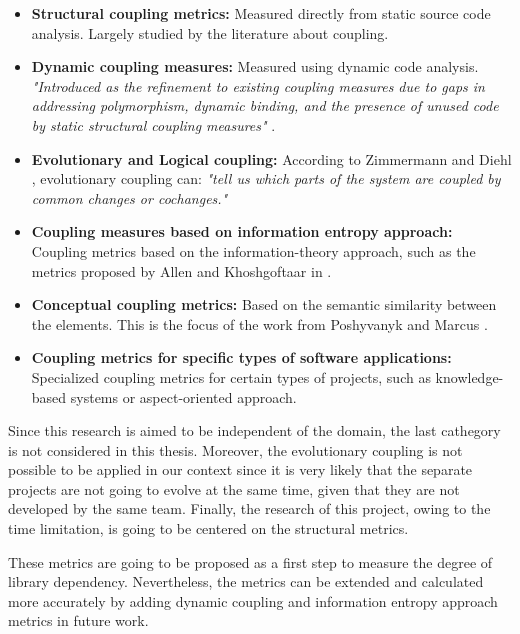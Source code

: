 \begin{itemize}
  \item \textbf{Structural coupling metrics:} Measured directly from static source code analysis. Largely studied by the literature about coupling.

  \item \textbf{Dynamic coupling measures:} Measured using dynamic code analysis. \textit{"Introduced as the refinement to existing coupling measures due to gaps in addressing polymorphism, dynamic binding, and the presence of unused code by static structural coupling measures"} \cite{poshyvanyk2006conceptual}.

  \item \textbf{Evolutionary and Logical coupling:} According to Zimmermann and Diehl \cite{zimmermann2005mining}, evolutionary coupling can: \textit{"tell us which parts of the system are coupled by common changes or cochanges."}

  \item \textbf{Coupling measures based on information entropy approach:} Coupling metrics based on the information-theory approach, such as the metrics proposed by Allen and Khoshgoftaar in \cite{allen1999measuring}.

  \item \textbf{Conceptual coupling metrics:} Based on the semantic similarity between the elements. This is the focus of the work from Poshyvanyk and Marcus \cite{poshyvanyk2006conceptual}.

  \item \textbf{Coupling metrics for specific types of software applications:} Specialized coupling metrics for certain types of projects, such as knowledge-based systems or aspect-oriented approach.
\end{itemize}

\blankl
Since this research is aimed to be independent of the domain, the last cathegory is not considered in this thesis. Moreover, the evolutionary coupling is not possible to be applied in our context since it is very likely that the separate projects are not going to evolve at the same time, given that they are not developed by the same team. Finally, the research of this project, owing to the time limitation, is going to be centered on the structural metrics.

These metrics are going to be proposed as a first step to measure the degree of library dependency. Nevertheless, the metrics can be extended and calculated more accurately by adding dynamic coupling and information entropy approach metrics in future work.

